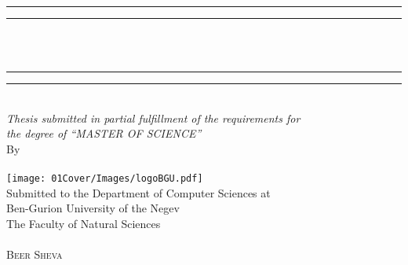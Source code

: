 \begin{center}
\vspace*{2mm}
\rule[0.5ex]{\linewidth}{2pt}\vspace*{-\baselineskip}\vspace*{3.2pt}
\rule[0.5ex]{\linewidth}{1pt}\\
[\baselineskip]{\Huge \thesisTitle}\\[3mm]
\rule[0.5ex]{\linewidth}{1pt}\vspace*{-\baselineskip}\vspace{3.2pt}
\rule[0.5ex]{\linewidth}{2pt}\\
[9mm]
{\large \textit{Thesis submitted in partial fulfillment of the requirements for\\ [2mm]
    the degree of \enquote{MASTER OF SCIENCE}
}}\\ [2mm]
\vspace{8mm}
{\large By}\\
\vspace{2.5mm}
{\large\textsc{\thesisAuthor}}\\
\vspace{10mm}
\texttt{[image: 01Cover/Images/logoBGU.pdf]}\\
\vspace{9mm}
{\large Submitted to the Department of Computer Sciences at\\Ben-Gurion University
of the Negev\\The Faculty of Natural Sciences
}\\
\vspace{5em}
{\large\textsc{}}\\
\vspace{2em}
{\large\textsc{Beer Sheva}}
\end{center}
\thispagestyle{empty} %
\cleardoubleoddemptypage

